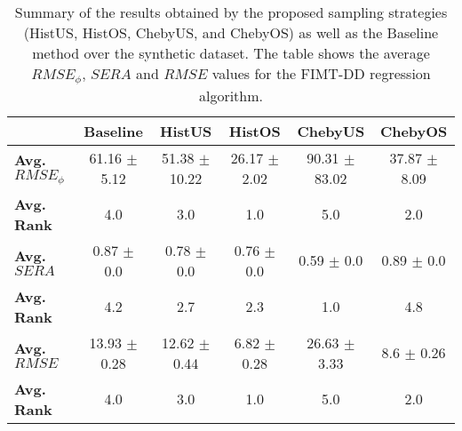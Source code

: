 \begin{table}[!htb]
\caption{Summary of the results obtained by the proposed sampling strategies (HistUS, HistOS, ChebyUS, and
ChebyOS) as well as the Baseline method over the synthetic dataset. The table shows the average
$RMSE_{\phi}$, $SERA$ and $RMSE$ values for the FIMT-DD regression algorithm.}
\label{tab:result_phi_sera_synthetic}
\begin{tabular*}{\textwidth}{@{\extracolsep{\fill}}lccccc}
\toprule
 & Baseline & HistUS & HistOS & ChebyUS & ChebyOS \\
\midrule
{\bf Avg. $RMSE_{\phi}$} & 61.16 $\pm$ 5.12 & 51.38 $\pm$ 10.22 & 26.17 $\pm$ 2.02 & 90.31 $\pm$ 83.02 & 37.87 $\pm$ 8.09 \\
{\bf Avg. Rank} & 4.0 & 3.0 & 1.0 & 5.0 & 2.0 \\
\midrule
{\bf Avg. $SERA$} & 0.87 $\pm$ 0.0 & 0.78 $\pm$ 0.0 & 0.76 $\pm$ 0.0 & 0.59 $\pm$ 0.0 & 0.89 $\pm$ 0.0 \\
{\bf Avg. Rank} & 4.2 & 2.7 & 2.3 & 1.0 & 4.8 \\
\midrule
{\bf Avg. $RMSE$} & 13.93 $\pm$ 0.28 & 12.62 $\pm$ 0.44 & 6.82 $\pm$ 0.28 & 26.63 $\pm$ 3.33 & 8.6 $\pm$ 0.26 \\
{\bf Avg. Rank} & 4.0 & 3.0 & 1.0 & 5.0 & 2.0 \\
\bottomrule
\end{tabular*}
\end{table}